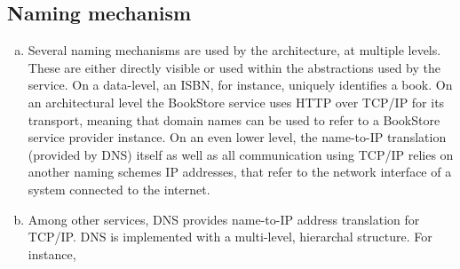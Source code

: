\documentclass[11pt,a4paper,english]{article}
\begin{document}
\subsection{Naming mechanism}
\begin{enumerate}[(a)]
\item{Several naming mechanisms are used by the architecture, at multiple levels. These are either directly visible or used within the abstractions used by the service. On a data-level, an ISBN, for instance, uniquely identifies a book. On an architectural level the BookStore service uses HTTP over TCP/IP for its transport, meaning that domain names can be used to refer to a BookStore service provider instance. On an even lower level, the name-to-IP translation (provided by DNS) itself as well as all communication using TCP/IP relies on another naming schemes IP addresses, that refer to the network interface of a system connected to the internet.}

\item{Among other services, DNS provides name-to-IP address translation for TCP/IP. DNS is implemented with a multi-level, hierarchal structure.  For instance, }
\end{enumerate}


%
%



\end{document}
